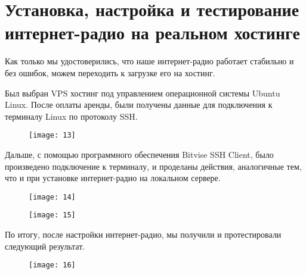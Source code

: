 \section{Установка, настройка и тестирование интернет-радио на реальном хостинге}

Как только мы удостоверились, что наше интернет-радио работает стабильно и без ошибок, можем переходить к загрузке его на хостинг.

Был выбран VPS хостинг под управлением операционной системы Ubuntu Linux. После оплаты аренды, были получены данные для подключения к терминалу Linux по протоколу SSH.
\begin{figure}[H]
  \centering
  \texttt{[image: 13]}
  \caption{}
  \label{fig:13}
\end{figure}

Дальше, с помощью программного обеспечения Bitvise SSH Client, было произведено подключение к терминалу, и проделаны действия, аналогичные тем, что и при установке интернет-радио на локальном сервере.
\begin{figure}[H]
  \centering
  \texttt{[image: 14]}
  \caption{}
  \label{fig:14}
\end{figure}

\begin{figure}[H]
  \centering
  \texttt{[image: 15]}
  \caption{}
  \label{fig:15}
\end{figure}

По итогу, после настройки интернет-радио, мы получили и протестировали следующий результат.
\begin{figure}[H]
  \centering
  \texttt{[image: 16]}
  \caption{}
  \label{fig:16}
\end{figure}
